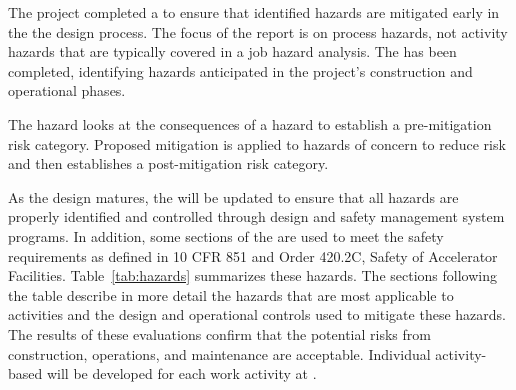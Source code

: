The  project completed a 
to ensure that identified hazards are mitigated early in the
the design process.  The focus of the report is on process hazards,
not activity hazards that are typically covered in a job hazard
analysis.  The  has been completed, identifying
hazards anticipated in the project's construction and operational
phases.

The hazard  looks at the consequences of a hazard
to establish a pre-mitigation risk category. Proposed mitigation is
applied to hazards of concern to reduce risk and then establishes a
post-mitigation risk category.

As the  design matures, the  will be
updated to ensure that all hazards are properly identified and
controlled through design and safety management system programs.  In
addition, some sections of the  are used to meet
the safety requirements as defined in 10 CFR 851 and  Order
420.2C, Safety of Accelerator Facilities.  Table~\ref{tab:hazards}
summarizes these hazards.  The sections following the table describe
in more detail the hazards that are most applicable to 
activities and the design and operational controls used to mitigate
these hazards. The results of these evaluations confirm that the
potential risks from construction, operations, and maintenance are
acceptable. Individual activity-based  will be
developed for each work  activity at
.

